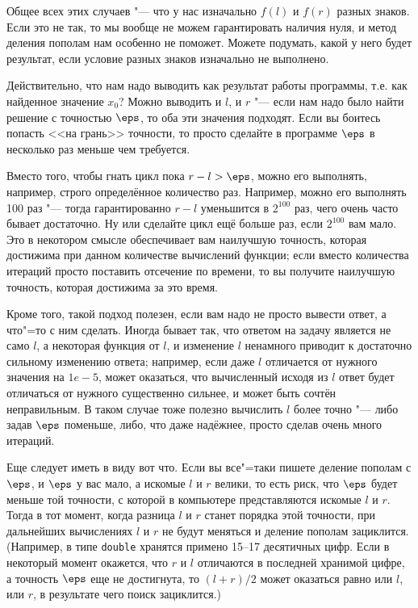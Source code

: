 Общее всех этих случаев "--- что у нас изначально $f(l)$ и $f(r)$ разных знаков. 
Если это не так, то мы вообще не можем гарантировать наличия нуля, и метод деления пополам нам особенно не поможет.
Можете подумать, какой у него будет результат, если условие разных знаков изначально не выполнено.

 Действительно, что нам надо выводить как результат работы программы, т.е. как найденное значение $x_0$?
Можно выводить и $l$, и $r$ "--- если нам надо было найти решение с точностью $\eps$, то оба эти значения подходят.
Если вы боитесь попасть <<на грань>> точности, то просто сделайте в программе $\eps$ в несколько раз меньше чем требуется.


 Вместо того, чтобы гнать цикл пока $r-l>\eps$, можно его выполнять, например, строго определённое количество раз.
Например, можно его выполнять 100 раз "--- тогда гарантированно $r-l$ уменьшится в $2^{100}$ раз, чего очень часто бывает достаточно.
Ну или сделайте цикл ещё больше раз, если $2^{100}$ вам мало. 
Это в некотором смысле обеспечивает вам наилучшую точность, которая достижима при данном количестве вычислений функции;
если вместо количества итераций просто поставить отсечение по времени, то вы получите наилучшую точность, которая достижима за это время.

Кроме того, такой подход полезен, если вам надо не просто вывести ответ, а что"=то с ним сделать.
Иногда бывает так, что ответом на задачу является не само $l$, а некоторая функция от $l$, и изменение $l$ ненамного приводит
к достаточно сильному изменению ответа; например, если даже $l$ отличается от нужного значения на $1e{-}5$, может оказаться,
что вычисленный исходя из $l$ ответ будет отличаться от нужного существенно сильнее,
и может быть сочтён неправильным. 
В таком случае тоже полезно вычислить $l$ более точно "--- либо задав $\eps$ поменьше, либо, что даже надёжнее,
просто сделав очень много итераций.

Еще следует иметь в виду вот что. Если вы все"=таки пишете деление пополам с $\eps$, и $\eps$ у вас мало, а искомые $l$ и $r$ велики, 
то есть риск, что $\eps$ будет меньше той точности, с которой в компьютере представляются искомые $l$ и $r$. 
Тогда в тот момент, когда разница $l$ и $r$ станет порядка этой точности, при дальнейших вычислениях $l$ и $r$ не будут меняться и 
деление пополам зациклится. (Например, в типе \verb`double` хранятся примено 15--17 десятичных цифр. 
Если в некоторый момент окажется, что $r$ и $l$ отличаются в последней хранимой цифре, а точность $\eps$ еще не достигнута,
то $(l+r)/2$ может оказаться равно или $l$, или $r$, в результате чего поиск зациклится.)


